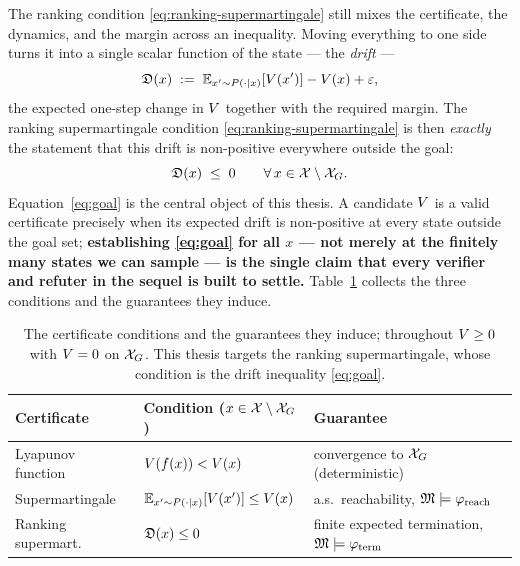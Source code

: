The ranking condition \eqref{eq:ranking-supermartingale} still mixes the
certificate, the dynamics, and the margin across an inequality. Moving everything
to one side turns it into a single scalar function of the state --- the
\emph{drift} ---
%
\begin{equation}
    \mathfrak{D}(x) \;:=\; \mathbb{E}_{x' \sim P(\cdot \mid x)}[V(x')] - V(x) + \varepsilon ,
    \label{eq:drift-def}
\end{equation}
%
the expected one-step change in $V$ together with the required margin. The
ranking supermartingale condition \eqref{eq:ranking-supermartingale} is then
\emph{exactly} the statement that this drift is non-positive everywhere outside
the goal:
%
\begin{equation}
    \mathfrak{D}(x) \;\leq\; 0 \qquad \forall\, x \in \mathcal{X} \setminus \mathcal{X}_G .
    \label{eq:goal}
\end{equation}
%
Equation~\eqref{eq:goal} is the central object of this thesis. A candidate
$V$ is a valid certificate precisely when its expected drift is non-positive
at every state outside the goal set; \textbf{establishing \eqref{eq:goal} for all
$x$ --- not merely at the finitely many states we can sample --- is the single
claim that every verifier and refuter in the sequel is built to settle.}
Table~\ref{tab:certificate-conditions} collects the three conditions and the
guarantees they induce.

\begin{table}[h]
\centering
\small
\begin{tabular}{lll}
\hline
\textbf{Certificate} & \textbf{Condition ($x \in \mathcal{X} \setminus \mathcal{X}_G$)} & \textbf{Guarantee} \\
\hline
Lyapunov function & $V(f(x)) < V(x)$ & convergence to $\mathcal{X}_G$ (deterministic) \\
Supermartingale & $\mathbb{E}_{x'\sim P(\cdot\mid x)}[V(x')] \leq V(x)$ & a.s.\ reachability, $\mathfrak{M} \models \varphi_{\mathrm{reach}}$ \\
Ranking supermart. & $\mathfrak{D}(x) \leq 0$ & finite expected termination, $\mathfrak{M} \models \varphi_{\mathrm{term}}$ \\
\hline
\end{tabular}
\caption{The certificate conditions and the guarantees they induce; throughout
$V \geq 0$ with $V = 0$ on $\mathcal{X}_G$. This thesis targets the ranking
supermartingale, whose condition is the drift inequality \eqref{eq:goal}.}
\label{tab:certificate-conditions}
\end{table}

